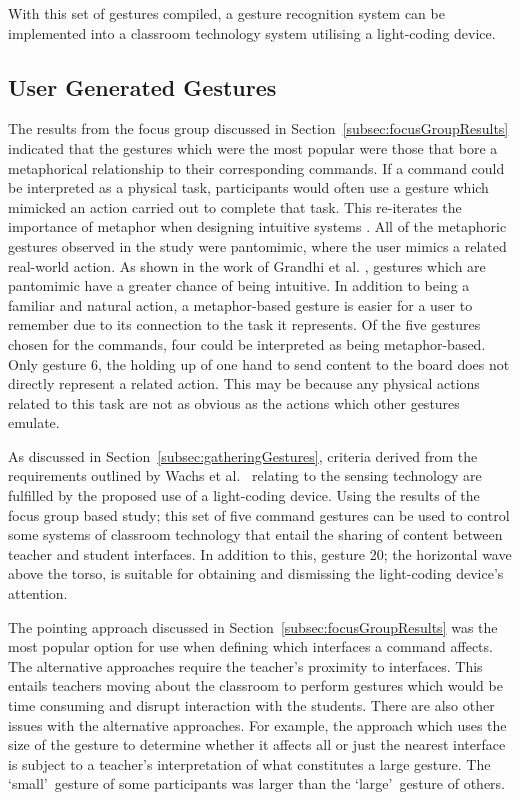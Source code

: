 \documentclass[link]{IWCOMP}
\begin{document}
With this set of gestures compiled, a gesture recognition system can be implemented into a classroom technology system utilising a light-coding device.

\subsection{User Generated Gestures}
\label{subsec:userGeneratedGestures}

The results from the focus group discussed in Section~\ref{subsec:focusGroupResults} indicated that the gestures which were the most popular were those that bore a metaphorical relationship to their corresponding commands.
If a command could be interpreted as a physical task, participants would often use a gesture which mimicked an action carried out to complete that task.
This re-iterates the importance of metaphor when designing intuitive systems \citep{Wang2008}.
All of the metaphoric gestures observed in the study were pantomimic, where the user mimics a related real-world action.
As shown in the work of Grandhi et al. \citeyearpar{Grandhi2011}, gestures which are pantomimic have a greater chance of being intuitive.
In addition to being a familiar and natural action, a metaphor-based gesture is easier for a user to remember due to its connection to the task it represents.
Of the five gestures chosen for the commands, four could be interpreted as being metaphor-based.
Only gesture 6, the holding up of one hand to send content to the board does not directly represent a related action.
This may be because any physical actions related to this task are not as obvious as the actions which other gestures emulate.

As discussed in Section~\ref{subsec:gatheringGestures}, criteria derived from the requirements outlined by Wachs et al.~\citeyearpar{Wachs2011} relating to the sensing technology are fulfilled by the proposed use of a light-coding device.
Using the results of the focus group based study; this set of five command gestures can be used to control some systems of classroom technology that entail the sharing of content between teacher and student interfaces.
In addition to this, gesture 20; the horizontal wave above the torso, is suitable for obtaining and dismissing the light-coding device's attention.

The pointing approach discussed in Section~\ref{subsec:focusGroupResults} was the most popular option for use when defining which interfaces a command affects.
The alternative approaches require the teacher's proximity to interfaces.
This entails teachers moving about the classroom to perform gestures which would be time consuming and disrupt interaction with the students.
There are also other issues with the alternative approaches.
For example, the approach which uses the size of the gesture to determine whether it affects all or just the nearest interface is subject to a teacher's interpretation of what constitutes a large gesture.
The \lq small\rq\ gesture of some participants was larger than the \lq large\rq\ gesture of others.
\end{document}

